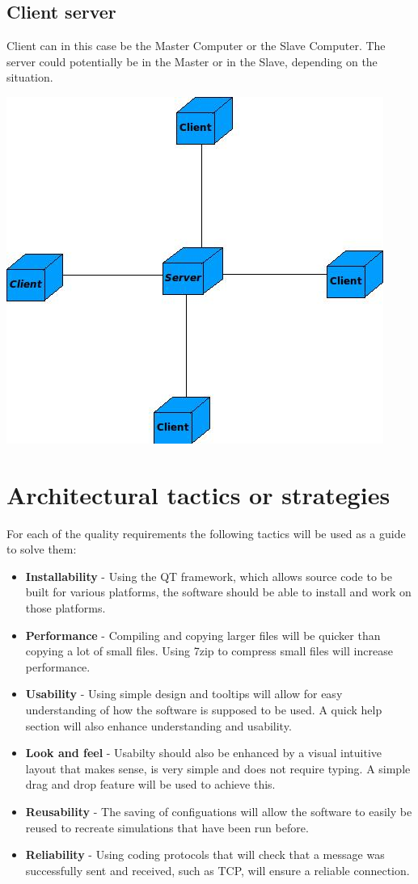 \documentclass[a4paper,12pt,final]{article}
\begin{document}
\subsection{Client server}
Client can in this case be the Master Computer or the Slave Computer. The server could potentially be in the Master or in the Slave, depending on the situation.
\begin{center}
  	\includegraphics[scale=0.6]{ClientServer.jpeg} 
  \end{center}

\section{Architectural tactics or strategies}
For each of the quality requirements the following tactics will be used as a guide to solve them:
\begin{itemize}
\item \textbf{Installability} - Using the QT framework, which allows source code to be built for various platforms, the software should be able to install and work on those platforms.
\item \textbf{Performance} - Compiling and copying larger files will be quicker than copying a lot of small files. Using 7zip to compress small files will increase performance.
\item \textbf{Usability} - Using simple design and tooltips will allow for easy understanding of how the software is supposed to be used.  A quick help section will also enhance understanding and usability.
\item \textbf{Look and feel} - Usabilty should also be enhanced by a visual intuitive layout that makes sense, is very simple and does not require typing.  A simple drag and drop feature will be used to achieve this.
\item \textbf{Reusability} - The saving of configuations will allow the software to easily be reused to recreate simulations that have been run before.
\item \textbf{Reliability} - Using coding protocols that will check that a message was successfully sent and received, such as TCP, will ensure a reliable connection.
\end{itemize}
\end{document}
